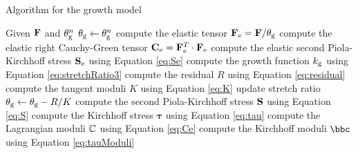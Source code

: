 \begin{algorithm}
	\caption{Algorithm for the growth model}  \label{algo}
	\begin{algorithmic}[1]
	\State Given $\bold{F}$ and $\theta_{\mathrm{g}}^n$
	\State $\theta_{\mathrm{g}} \leftarrow \theta_{\mathrm{g}}^n$
	\State compute the elastic tensor $\bold{F}_{\mathrm{e}} = \bold{F}/\theta_{\mathrm{g}}$
	\State compute the elastic right Cauchy-Green tensor $\bold{C}_{\mathrm{e}} = \bold{F}_{\mathrm{e}}^T\cdot\bold{F}_{\mathrm{e}}$
	\State compute the elastic second Piola-Kirchhoff stress $\bold{S}_{\mathrm{e}}$ using Equation \ref{eq:Se}
		\State compute the growth function $k_{\mathrm{g}}$ using Equation \ref{eq:stretchRatio3}
		\State compute the residual $R$ using Equation \ref{eq:residual}
		\State compute the tangent moduli $K$ using Equation \ref{eq:K}
		\State update stretch ratio $\theta_{\mathrm{g}} \leftarrow \theta_{\mathrm{g}} - R/K$
	\EndIf
	\EndWhile
	\State compute the second Piola-Kirchhoff stress $\bold{S}$ using Equation \ref{eq:S}
	\State compute the Kirchhoff stress $\boldsymbol\tau$ using Equation \ref{eq:tau}
	\State compute the Lagrangian moduli $\mathbb{C}$ using Equation \ref{eq:Ce}
	\State compute the Kirchhoff moduli $\bbc$ using Equation \ref{eq:tauModuli}
	\end{algorithmic}
\end{algorithm}




